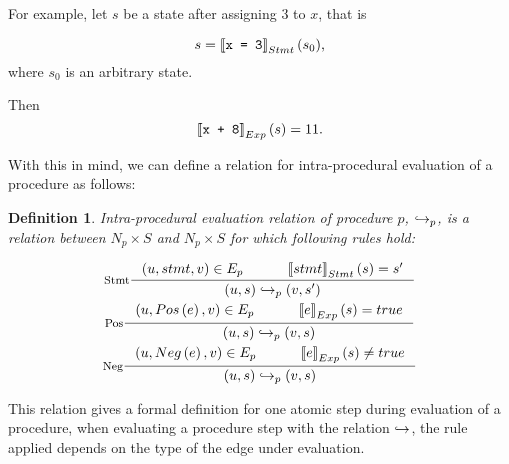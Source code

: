 \documentclass[..thesis.tex]{subfiles}
\newtheorem{defin}{Definition}[section]
\begin{document}
For example, let $s$ be a state after assigning $3$ to $x$, that is

\begin{equation*}
s = \left\llbracket \text{\texttt{x = 3}} \right\rrbracket_{Stmt} (s_0) \text{,}
\end{equation*}
where $s_0$ is an arbitrary state. 

Then 
\begin{equation*}
\left\llbracket \text{\texttt{x + 8}} \right\rrbracket_{Exp} \left( s \right) = 11 \text{.}    
\end{equation*}

With this in mind, we can define a relation for intra-procedural evaluation of a procedure as follows:

\begin{defin}
Intra-procedural evaluation relation of procedure $p$, $\hookrightarrow_p$,
is a relation between $N_p \times S$ and $N_p \times S$ for which following rules hold:

\addtolength{\jot}{2em}
\begin{gather*}
  \inference[Stmt]{ \lp u, stmt, v \rp \in E_{p}  \separ  \lllb stmt \rrrb_{Stmt} \lp s \rp = s'}{\lp u, s \rp \intraproc_p \lp v, s' \rp} \\
  \inference[Pos]{ \lp u, Pos \lp e \rp , v \rp \in E_{p} \separ \lllb e \rrrb_{Exp} \lp s \rp = true }{\lp u, s \rp \intraproc_p \lp v, s \rp} \\  
  \inference[Neg]{ \lp u, Neg \lp e \rp , v \rp \in E_{p} \separ \lllb e \rrrb_{Exp} \lp s \rp \neq true }{\lp u, s \rp \intraproc_p \lp v, s \rp} 
\end{gather*}
\addtolength{\jot}{-2em}

\end{defin}


This relation gives a formal definition for one atomic step during evaluation of a procedure, when evaluating a procedure step with the relation $\hookrightarrow$,
the rule applied depends on the type of the edge under evaluation. 

\end{document}

